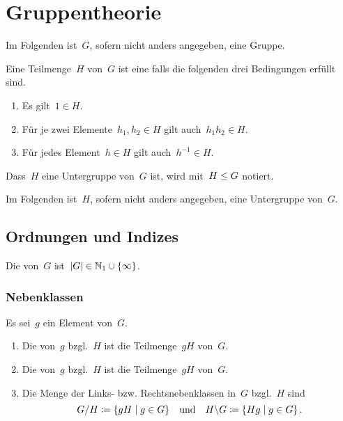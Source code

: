 \chapter{Gruppentheorie}

\begin{convention}
  Im Folgenden ist~$G$, sofern nicht anders angegeben, eine Gruppe.
\end{convention}

\begin{definition}
  Eine Teilmenge~$H$ von~$G$ ist eine  falls die folgenden drei Bedingungen erfüllt sind.
  \begin{enumerate}
    \item
      Es gilt~$1 \in H$.
    \item
      Für je zwei Elemente~$h_1, h_2 \in H$ gilt auch~$h_1 h_2 \in H$.
    \item
      Für jedes Element~$h \in H$ gilt auch~$h^{-1} \in H$.
  \end{enumerate}
  Dass~$H$ eine Untergruppe von~$G$ ist, wird mit~$H \leq G$ notiert.
\end{definition}

\begin{convention}
  Im Folgenden ist~$H$, sofern nicht anders angegeben, eine Untergruppe von~$G$.
\end{convention}





\section{Ordnungen und Indizes}

\begin{definition}
  Die  von~$G$ ist~$\lvert G\rvert \in \mathbb{N}_{1} \cup \{ \infty \}$.
\end{definition}



\subsection{Nebenklassen}

\begin{definition}
  Es sei~$g$ ein Element von~$G$.
  \begin{enumerate}
    \item
      Die  von~$g$ bzgl.~$H$ ist die Teilmenge~$gH$ von~$G$.
    \item
      Die  von~$g$ bzgl.~$H$ ist die Teilmenge~$gH$ von~$G$.
    \item
      Die Menge der Links- bzw. Rechtsnebenklassen in~$G$ bzgl.~$H$ sind
      \[
        G/H \defined \{ gH \suchthat g \in G \}
        \quad\text{und}\quad
        H \backslash G \defined \{ Hg \suchthat g \in G \} \,.
      \]
  \end{enumerate}
\end{definition}

